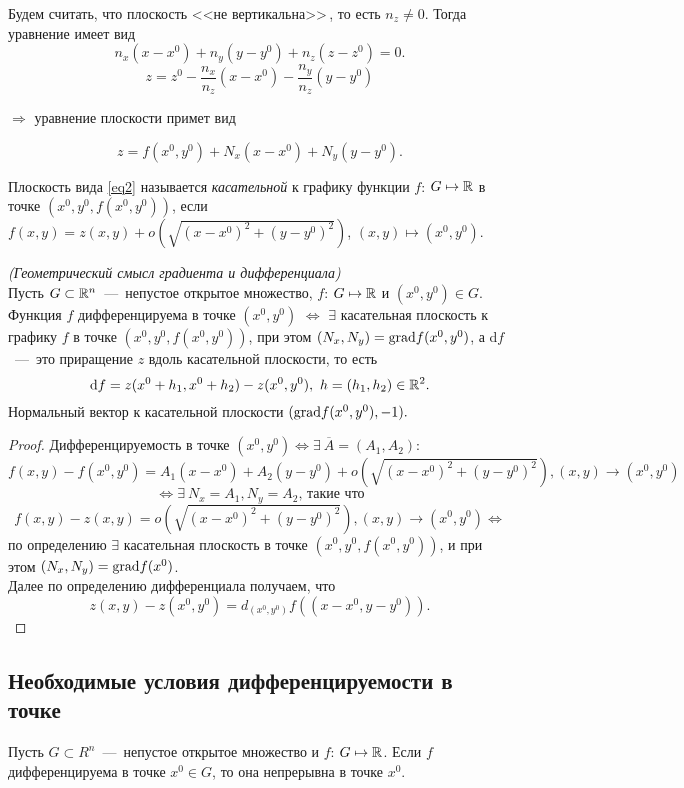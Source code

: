 Будем считать, что плоскость <<не вертикальна>>\,, то есть $n_z \neq 0$. Тогда уравнение имеет вид $$n_x(x-x^0) + n_y(y-y^0) + n_z(z - z^0) = 0.$$
$$z = z^0 - \dfrac{n_x}{n_z}(x-x^0) - \dfrac{n_y}{n_z}(y - y^0)$$

$\Longrightarrow$ уравнение плоскости примет вид

\begin{equation}\label{eq2}\tag{$\star$}
    z = f(x^0, y^0) + N_x(x-x^0)+N_y(y-y^0).
\end{equation}

Плоскость вида \eqref{eq2} называется \textit{касательной} к графику функции $f$: $G \mapsto \mathbb{R}$ в точке $(x^0, y^0, f(x^0, y^0))$, если $f(x, y) = z(x, y) + o\left( \sqrt{(x-x^0)^2 + (y-y^0)^2}\right)$, $(x, y) \mapsto (x^0, y^0).$

\begin{theorem}
    \textit{(Геометрический смысл градиента и дифференциала)} \\ Пусть $G \subset \mathbb{R}^n$~---~непустое открытое множество, $f$: $G \mapsto \mathbb{R}$ и $(x^0, y^0) \in G$.
    Функция $f$ дифференцируема в точке $(x^0, y^0)$ $\Longleftrightarrow$ $\exists$ касательная плоскость к графику $f$ в точке $(x^0, y^0, f(x^0, y^0))$, при этом $\left(N_x, N_y\right) = \textup{grad}f(x^0, y^0)$, а d$f$~---~это приращение $z$ вдоль касательной плоскости, то есть
    $$\text{d}f = z(x^0 + h_1, x^0 + h_2) - z(x^0, y^0), \ h=(h_1, h_2) \in \mathbb{R}^2.$$
    Нормальный вектор к касательной плоскости $(\textup{grad} f(x^0, y^0), -1).$
\end{theorem}

\begin{proof}
    Дифференцируемость в точке $(x^0, y^0) \Longleftrightarrow \exists \ \overline{A} = (A_1, A_2)$:
    $$f(x, y) -  f(x^0, y^0) = A_1(x-x^0)+A_2(y-y^0)+o\left(\sqrt{\left(x-x^0\right)^2+\left(y-y^0\right)^2}\right), (x, y) \to \left(x^0, y^0\right)$$
    $$\Longleftrightarrow \exists \ N_x=A_1, N_y=A_2 \text{, такие что}$$
    $$f(x, y) - z(x, y) = o(\sqrt{\left(x-x^0\right)^2+\left(y-y^0\right)^2}), (x, y) \to \left(x^0, y^0\right) \Longleftrightarrow$$ 
    по определению $\exists$ касательная плоскость в точке $\left(x^0, y^0, f\left(x^0, y^0\right)\right)$, и при этом $\left(N_x, N_y\right) = \textup{grad}f(x^0)$. \\
    Далее по определению дифференциала получаем, что 
    $$z(x, y) - z(x^0, y^0) = d_{(x^0, y^0)}f((x-x^0, y-y^0)).$$
\end{proof}

\subsection{Необходимые условия дифференцируемости в точке}
\begin{theorem}
    Пусть $G \subset R^n$~---~непустое открытое множество и $f$: $G \mapsto \mathbb{R}$. Если $f$ дифференцируема в точке $x^0 \in G$, то она непрерывна в точке $x^0$.
\end{theorem}

